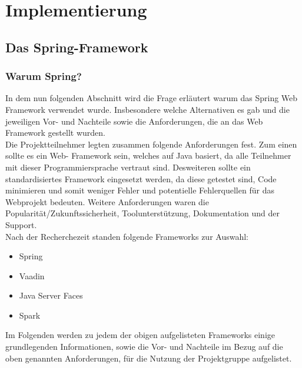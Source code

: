 \chapter{Implementierung}

\section{Das Spring-Framework}
\subsection{Warum Spring?}
In dem nun folgenden Abschnitt wird die Frage erläutert warum das Spring Web Framework verwendet 
wurde. Insbesondere welche Alternativen es gab und die jeweiligen Vor- und Nachteile sowie die 
Anforderungen, die an das Web Framework gestellt wurden. \\
Die Projektteilnehmer legten zusammen folgende Anforderungen fest. Zum einen sollte es ein Web-
Framework sein, welches auf Java basiert, da alle Teilnehmer mit dieser Programmiersprache vertraut 
sind. Desweiteren sollte ein standardisiertes Framework eingesetzt werden, da diese getestet sind, 
Code minimieren und somit weniger Fehler und potentielle Fehlerquellen für das Webprojekt bedeuten. 
Weitere Anforderungen waren die Popularität/Zukunftssicherheit, Toolunterstützung, Dokumentation 
und der Support. \\
Nach der Recherchezeit standen folgende Frameworks zur Auswahl:
\begin{itemize}
  \item Spring
  \item Vaadin
  \item Java Server Faces 
  \item Spark
\end{itemize}
\medskip
Im Folgenden werden zu jedem der obigen aufgelisteten Frameworks einige grundlegenden 
Informationen, sowie die Vor- und Nachteile im Bezug auf die oben genannten Anforderungen, für die 
Nutzung der Projektgruppe aufgelistet. 
